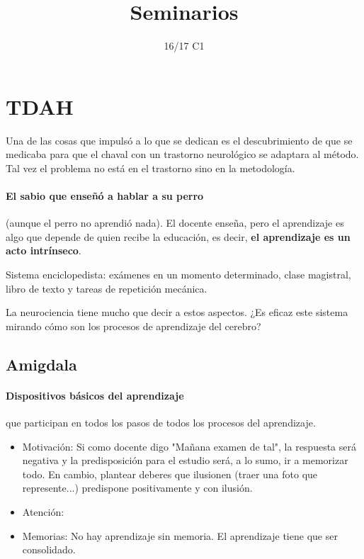 \documentclass[palatino]{apuntes}
\title{Seminarios}
\author{}
\date{16/17 C1}
\begin{document}
\pagestyle{plain}
\maketitle

\tableofcontents
\newpage

\section{TDAH}

Una de las cosas que impulsó a lo que se dedican es el descubrimiento de que se medicaba para que el chaval con un trastorno neurológico se adaptara al método. 
%
Tal vez el problema no está en el trastorno sino en la metodología.

\paragraph{El sabio que enseñó a hablar a su perro} (aunque el perro no aprendió nada).
%
El docente enseña, pero el aprendizaje es algo que depende de quien recibe la educación, es decir, \textbf{el aprendizaje es un acto intrínseco}. 

Sistema enciclopedista: exámenes en un momento determinado, clase magistral, libro de texto y tareas de repetición mecánica.

La neurociencia tiene mucho que decir a estos aspectos. 
%
¿Es eficaz este sistema mirando cómo son los procesos de aprendizaje del cerebro?


\subsection{Amigdala}
\paragraph{Dispositivos básicos del aprendizaje} que participan en todos los pasos de todos los procesos del aprendizaje.

\begin{itemize}
	\item Motivación: Si como docente digo "Mañana examen de tal", la respuesta será negativa y la predisposición para el estudio será, a lo sumo, ir a memorizar todo.
	En cambio, plantear deberes que ilusionen (traer una foto que represente...) predispone positivamente y con ilusión.
	\item Atención:
	\item Memorias: No hay aprendizaje sin memoria. El aprendizaje tiene que ser consolidado.
\end{itemize}
\end{document}
